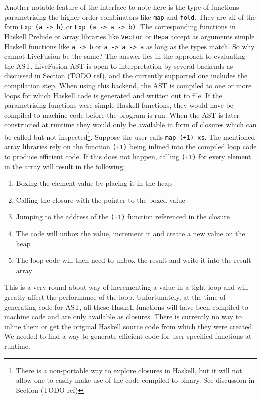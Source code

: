 \documentclass[preamble.tex]{subfiles}
\begin{document}
Another notable feature of the interface to note here is the type of functions parametrising the higher-order combinators like \texttt{map} and \texttt{fold}. They are all of the form \texttt{Exp (a -> b)} or \texttt{Exp (a -> a -> b)}. The corresponding functions in Haskell Prelude or array libraries like \texttt{Vector} or \texttt{Repa} accept as arguments simple Haskell functions like \texttt{a -> b} or \texttt{a -> a -> a} as long as the types match. So why cannot LiveFusion be the same? The answer lies in the approach to evaluating the AST. LiveFusion AST is open to interpretation by several backends as discussed in Section (TODO ref), and the currently supported one includes the compilation step. When using this backend, the AST is compiled to one or more loops for which Haskell code is generated and written out to file. If the parametrising functions were simple Haskell functions, they would have be compiled to machine code before the program is run. When the AST is later constructed at runtime they would only be available in form of closures which can be called but not inspected\footnote{There is a non-portable way to explore closures in Haskell, but it will not allow one to easily make use of the code compiled to binary. See discussion in Section (TODO ref)}. Suppose the user calls \texttt{map (+1) xs}. The mentioned array libraries rely on the function \texttt{(+1)} being inlined into the compiled loop code to produce efficient code. If this does not happen, calling \texttt{(+1)} for every element in the array will result in the following:
\begin{enumerate}
\item Boxing the element value by placing it in the heap
\item Calling the closure with the pointer to the boxed value
\item Jumping to the address of the \texttt{(+1)} function referenced in the closure
\item The code will unbox the value, increment it and create a new value on the heap
\item The loop code will then need to unbox the result and write it into the result array
\end{enumerate}

This is a very round-about way of incrementing a value in a tight loop and will greatly affect the performance of the loop. Unfortunately, at the time of generating code for AST, all these Haskell functions will have been compiled to machine code and are only available as closures. There is currently no way to inline them or get the original Haskell source code from which they were created. We needed to find a way to generate efficient code for user specified functions at runtime.
\end{document}
